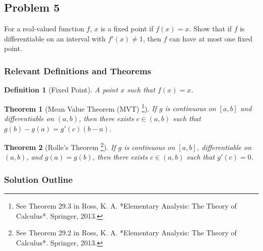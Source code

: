 \documentclass{article}
\newtheorem*{definition}{Definition}
\newtheorem*{theorem}{Theorem}
\begin{document}
\hrulefill

\subsection*{Problem 5}

For a real-valued function \(f\), \(x\) is a fixed point if \(f(x)=x\). Show that if \(f\) is differentiable on an interval with \(f'(x)\ne 1\), then \(f\) can have at most one fixed point.

\subsubsection*{Relevant Definitions and Theorems}

\begin{definition}[Fixed Point]
A point \(x\) such that \(f(x) = x\).
\end{definition}

\begin{theorem}[Mean Value Theorem (MVT) \footnote{See Theorem 29.3 in Ross, K. A. *Elementary Analysis: The Theory of Calculus*. Springer, 2013.}]
If \(g\) is continuous on \([a, b]\) and differentiable on \((a, b)\), then there exists \(c \in (a, b)\) such that \(g(b) - g(a) = g'(c)(b - a)\).
\end{theorem}

\begin{theorem}[Rolle's Theorem \footnote{See Theorem 29.2 in Ross, K. A. *Elementary Analysis: The Theory of Calculus*. Springer, 2013.}]
If \(g\) is continuous on \([a, b]\), differentiable on \((a, b)\), and \(g(a) = g(b)\), then there exists \(c \in (a, b)\) such that \(g'(c) = 0\).
\end{theorem}

\subsubsection*{Solution Outline}
\end{document}
